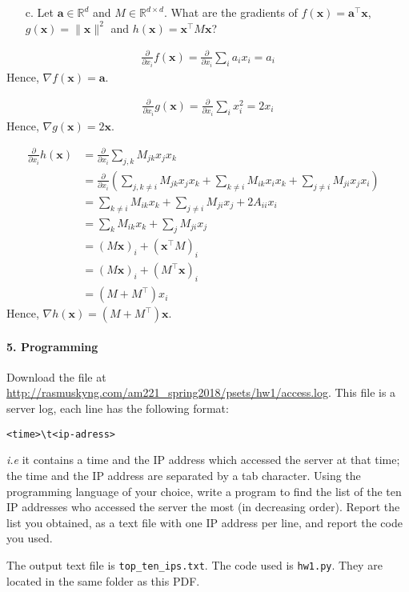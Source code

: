 \documentclass[11pt]{article}
\newcommand{\R}{\mathbb{R}}                     %
\newcommand{\bx}{\mathbf{x}}
\newcommand{\ba}{\mathbf{a}}
\begin{document}
\begin{itemize}
\item[c.] Let $\ba\in\R^d$ and $M\in\R^{d\times d}$. What are the gradients
of $f(\bx) = \ba^\intercal \bx$, $g(\bx) = \|\bx\|^2$ and $h(\bx)
= \bx^\intercal M\bx$?
\end{itemize}

\color{blue}
\begin{align*}
\frac{\partial}{\partial x_i}f(\bx)=\frac{\partial}{\partial x_i}\sum_i a_ix_i=a_i
\end{align*}
Hence, $\nabla f(\bx)=\ba$.

\begin{align*}
\frac{\partial}{\partial x_i}g(\bx)=\frac{\partial}{\partial x_i}\sum_i x_i^2=2x_i
\end{align*}
Hence, $\nabla g(\bx)=2\bx$.

\begin{align*}
\frac{\partial}{\partial x_i}h(\bx)&=\frac{\partial}{\partial x_i}\sum_{j,k} M_{jk}x_jx_k &\\
&= \frac{\partial}{\partial x_i}(\sum_{j,k\neq i} M_{jk}x_jx_k + \sum_{k\neq i} M_{ik}x_ix_k + \sum_{j\neq i} M_{ji}x_jx_i) &\\
&= \sum_{k\neq i}M_{ik}x_k + \sum_{j\neq i}M_{ji}x_j + 2A_{ii}x_i &\\
&= \sum_k M_{ik}x_k + \sum_j M_{ji}x_j &\\
&= (M\bx)_i+(\bx^\intercal M)_i &\\
&= (M\bx)_i+(M^\intercal \bx)_i &\\
&= (M+M^\intercal )x_i
\end{align*}
Hence, $\nabla h(\bx)=(M+M^\intercal )\bx$.
\color{black}

\paragraph{5. Programming}

Download the file at \url{http://rasmuskyng.com/am221_spring2018/psets/hw1/access.log}. This file is
a server log, each line has the following format:
\begin{center}
    \begin{verbatim}<time>\t<ip-adress>\end{verbatim}
\end{center}
\emph{i.e} it contains a time and the IP address which accessed the server at
that time; the time and the IP address are separated by a tab character. Using
the programming language of your choice, write a program to find the list of
the ten IP addresses who accessed the server the most (in decreasing order). 
Report the list you obtained, as a text file with one IP address
per line, and report the code you used.

\color{blue}
The output text file is \verb|top_ten_ips.txt|. The code used is \verb|hw1.py|. They are located in the same folder as this PDF.
\color{black}
\end{document}
